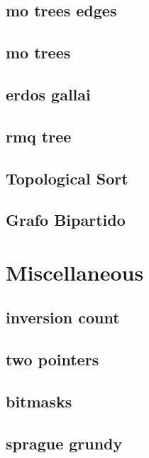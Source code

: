 \subsection{mo trees edges}
\raggedbottom
\hrulefill
\subsection{mo trees}
\raggedbottom
\hrulefill
\subsection{erdos gallai}
\raggedbottom
\hrulefill
\subsection{rmq tree}
\raggedbottom
\hrulefill
\subsection{Topological Sort}
\raggedbottom
\hrulefill
\subsection{Grafo Bipartido}
\raggedbottom
\hrulefill

\section{Miscellaneous}
\subsection{inversion count}
\raggedbottom
\hrulefill
\subsection{two pointers}
\raggedbottom
\hrulefill
\subsection{bitmasks}
\raggedbottom
\hrulefill
\subsection{sprague grundy}
\raggedbottom
\hrulefill
